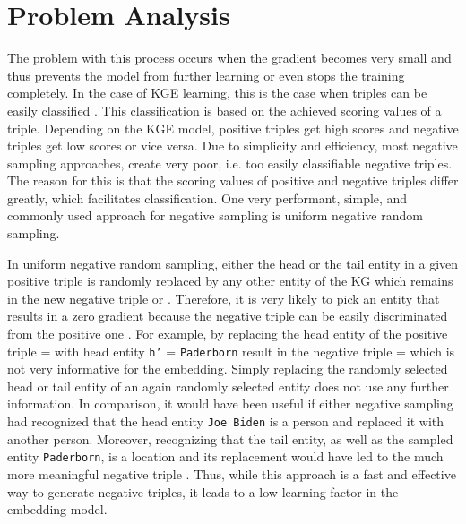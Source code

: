 \section{Problem Analysis}
\label{sec:problem_analysis}
The problem with this process occurs when the gradient becomes very small and thus prevents the model from further learning or even stops the training completely.
In the case of KGE learning, this is the case when triples can be easily classified \cite{zhang2021efficient}. 
This classification is based on the achieved scoring values of a triple.
Depending on the KGE model, positive triples get high scores and negative triples get low scores or vice versa. 
Due to simplicity and efficiency, most negative sampling approaches, create very poor, i.e. too easily classifiable negative triples. 
The reason for this is that the scoring values of positive and negative triples differ greatly, which facilitates classification. 
One very performant, simple, and commonly used approach for negative sampling is uniform negative random sampling.

In uniform negative random sampling, either the head or the tail entity in a given positive triple  is randomly replaced by any other entity of the \ac{KG} which remains in the new negative triple  or . 
Therefore, it is very likely to pick an entity that results in a zero gradient because the negative triple can be easily discriminated from the positive one \cite{cai2017kbgan}.
For example, by replacing the head entity of the positive triple  =  with head entity \texttt{h'} = \texttt{Paderborn} result in the negative triple  =   which is not very informative for the embedding.
Simply replacing the randomly selected head or tail entity of an again randomly selected entity does not use any further information.
In comparison, it would have been useful if either negative sampling had recognized that the head entity \texttt{Joe Biden} is a person and replaced it with another person.
Moreover, recognizing that the tail entity, as well as the sampled entity \texttt{Paderborn}, is a location and its replacement would have led to the much more meaningful negative triple .  
Thus, while this approach is a fast and effective way to generate negative triples, it leads to a low learning factor in the embedding model.

